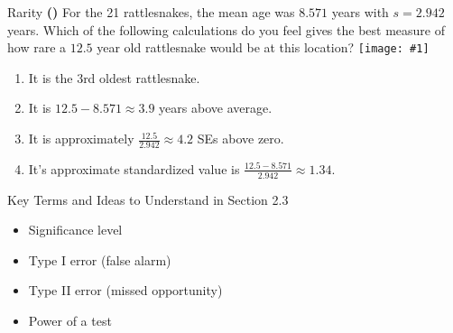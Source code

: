\documentclass[13pt]{beamer}
\newcounter{count}
\newcommand{\question}{ \textbf{(\decimal{count})} \stepcounter{count}}
\newcommand{\pic}[2]{\hfill\texttt{[image: \#1]}\hspace*{\fill}}
\begin{document}
\begin{frame}{Rarity}
\question For the 21 rattlesnakes, the mean age was $8.571$ years with $s=2.942$ years. Which of the following calculations do you feel gives the best measure of how rare a $12.5$ year old rattlesnake would be at this location?
\pic{rattlesnakeweights.PNG}{.5}
\begin{enumerate}[A]
   \item It is the 3rd oldest rattlesnake.
   \item It is $12.5-8.571\approx 3.9$ years above average.
   \item It is approximately $\frac{12.5}{2.942}\approx 4.2$ SEs above zero.
   \item It's approximate standardized value is $\frac{12.5-8.571}{2.942}\approx 1.34$.%
\end{enumerate}

\end{frame}


\begin{frame}{Key Terms and Ideas to Understand in Section 2.3}
\begin{itemize}
	\item Significance level
    \item Type I error (false alarm)
    \item Type II error (missed opportunity)
    \item Power of a test
\end{itemize}
\end{frame}
\end{document}
